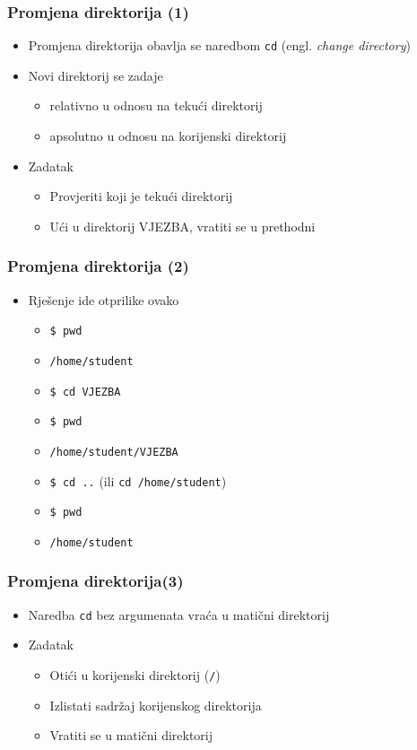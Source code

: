 \documentclass{beamer}
\begin{document}
\begin{frame}[t]
\frametitle{Promjena direktorija (1)}
\begin{itemize}
  \item Promjena direktorija obavlja se naredbom \texttt{cd} (engl. 
        \emph{change directory})
  \item Novi direktorij se zadaje 
  \begin{itemize}
    \item relativno u odnosu na tekući direktorij
    \item apsolutno u odnosu na korijenski direktorij  
  \end{itemize}
  \item Zadatak
  \begin{itemize}
    \item Provjeriti koji je tekući direktorij
    \item Ući u direktorij VJEZBA, vratiti se u prethodni
  \end{itemize}
\end{itemize}
\end{frame}

\begin{frame}[t]
\frametitle{Promjena direktorija (2)}
\begin{itemize}
  \item Rješenje ide otprilike ovako
  \begin{itemize}
    \item[] \texttt{\$ pwd}
    \item[] \texttt{/home/student}
    \item[] \texttt{\$ cd VJEZBA}
    \item[] \texttt{\$ pwd}
    \item[] \texttt{/home/student/VJEZBA}
    \item[] \texttt{\$ cd ..} (ili \texttt{cd /home/student})
    \item[] \texttt{\$ pwd}
    \item[] \texttt{/home/student}
  \end{itemize}
\end{itemize}
\end{frame}
 
\begin{frame}[t]
\frametitle{Promjena direktorija(3)}
\begin{itemize}
  \item Naredba \texttt{cd} bez argumenata vraća u matični direktorij
  \item Zadatak
  \begin{itemize}
    \item Otići u korijenski direktorij (\texttt{/})
    \item Izlistati sadržaj korijenskog direktorija
    \item Vratiti se u matični direktorij
  \end{itemize}
\end{itemize}
\end{frame}
\end{document}
